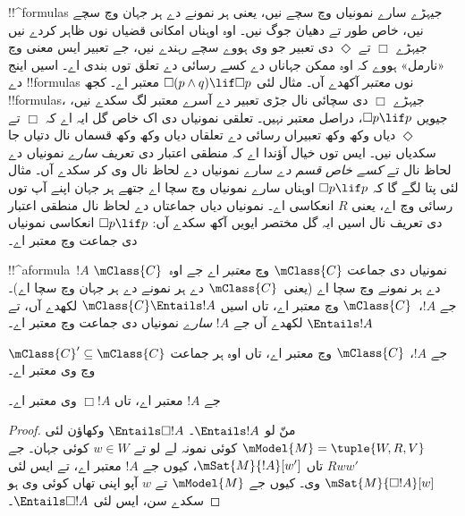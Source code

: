 \documentclass[../../../include/open-logic-section]{subfiles}
\begin{document}


\begin{explain}
  !!^{formula}s جیہڑے سارے نمونیاں وچ سچے نیں، یعنی ہر نمونے دے ہر جہان وچ سچے نیں، خاص طور تے دھیان جوگ نیں۔ اوہ اوہناں امکانی قضیاں نوں ظاہر کردے نیں جیہڑے $\Box$ تے $\Diamond$ دی تعبیر جو وی ہووے سچے رہندے نیں، جے تعبیر ایس معنی وچ «نارمل» ہووے کہ اوہ ممکن جہاناں دے کسے رسائی دے تعلق توں بندی اے۔ اسیں اینج دے !!{formula}s نوں \emph{معتبر} آکھدے آں۔ مثال لئی $\Box(p \land q) \lif \Box p$ معتبر اے۔ کجھ !!{formula}s، جیہڑے $\Box$ دی سچائی نال جڑی تعبیر دے آسرے معتبر لگ سکدے نیں، جیویں $\Box p \lif p$، دراصل معتبر نہیں۔ تعلقی نمونیاں دی اک خاص گل ایہ اے کہ $\Box$ تے $\Diamond$ دیاں وکھ وکھ تعبیراں رسائی دے تعلقاں دیاں وکھ وکھ قسماں نال دتیاں جا سکدیاں نیں۔ ایس توں خیال آؤندا اے کہ منطقی اعتبار دی تعریف \emph{سارے} نمونیاں دے لحاظ نال تے \emph{کسے خاص قسم دے} سارے نمونیاں دے لحاظ نال وی کر سکدے آں۔ مثال لئی پتا لگے گا کہ $\Box p \lif p$ اوہناں سارے نمونیاں وچ سچا اے جتھے ہر جہان اپنے آپ توں رسائی وچ اے، یعنی $R$ انعکاسی اے۔ نمونیاں دیاں جماعتاں دے لحاظ نال منطقی اعتبار دی تعریف نال اسیں ایہ گل مختصر ایویں آکھ سکدے آں: $\Box p \lif p$ انعکاسی نمونیاں دی جماعت وچ معتبر اے۔
\end{explain}

\begin{defn}
  !!^a{formula}~$!A$ نمونیاں دی جماعت $\mClass{C}$ وچ \emph{معتبر} اے جے اوہ~$\mClass{C}$ دے ہر نمونے وچ سچا اے (یعنی~$\mClass{C}$ دے ہر نمونے دے ہر جہان وچ سچا اے)۔ جے $!A$،~$\mClass{C}$ وچ معتبر اے، تاں اسیں $\mClass{C} \Entails !A$ لکھدے آں، تے $\Entails !A$ لکھدے آں جے $!A$ \emph{سارے} نمونیاں دی جماعت وچ معتبر اے۔
\end{defn}

\begin{prop}
  جے $!A$، $\mClass{C}$ وچ معتبر اے، تاں اوہ ہر جماعت
  $\mClass{C}' \subseteq \mClass{C}$ وچ وی معتبر اے۔
\end{prop}

\begin{prop}
  جے $!A$ معتبر اے، تاں $\Box!A$ وی معتبر اے۔
\end{prop}

\begin{proof}
  منّ لو $\Entails !A$۔ $\Entails \Box!A$ وکھاؤن لئی $\mModel{M} =
  \tuple{W, R, V}$ کوئی نمونہ لے لو تے $w \in W$ کوئی جہان۔ جے $Rww'$ تاں
  $\mSat{M}{!A}[w']$، کیوں جے $!A$ معتبر اے، تے ایس لئی
  $\mSat{M}{\Box!A}[w]$ وی۔ کیوں جے $\mModel{M}$ تے $w$ آپو اپنی تھاں کوئی وی ہو سکدے سن، ایس لئی
  $\Entails \Box!A$۔
\end{proof}
\end{document}
